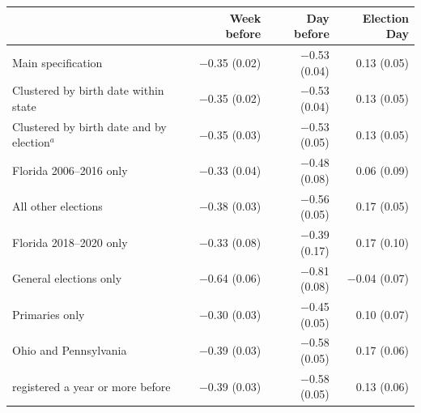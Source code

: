 \begin{tabular}{lrrr}
\toprule
 & Week before & Day before & Election Day \\
\midrule
Main specification & $-$0.35 (0.02) & $-$0.53 (0.04) & 0.13 (0.05) \\
Clustered by birth date within state & $-$0.35 (0.02) & $-$0.53 (0.04) & 0.13 (0.05) \\
Clustered by birth date and by election$^a$ & $-$0.35 (0.03) & $-$0.53 (0.05) & 0.13 (0.05) \\
Florida 2006--2016 only & $-$0.33 (0.04) & $-$0.48 (0.08) & 0.06 (0.09) \\
All other elections & $-$0.38 (0.03) & $-$0.56 (0.05) & 0.17 (0.05) \\
\quad Florida 2018--2020 only & $-$0.33 (0.08) & $-$0.39 (0.17) & 0.17 (0.10) \\
General elections only & $-$0.64 (0.06) & $-$0.81 (0.08) & $-$0.04 (0.07) \\
Primaries only & $-$0.30 (0.03) & $-$0.45 (0.05) & 0.10 (0.07) \\
Ohio and Pennsylvania & $-$0.39 (0.03) & $-$0.58 (0.05) & 0.17 (0.06) \\
\quad registered a year or more before & $-$0.39 (0.03) & $-$0.58 (0.05) & 0.13 (0.06) \\
\bottomrule
\end{tabular}
